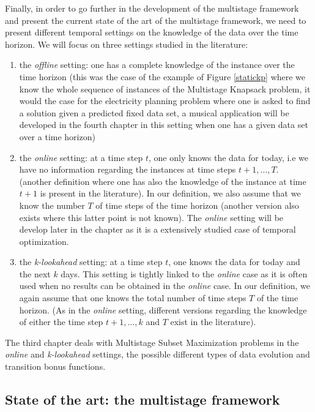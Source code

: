 \documentclass[a4paper]{book}
\begin{document}
Finally, in order to go further in the development of the multistage framework and present the current state of the art of the multistage framework, we need to present different temporal settings on the knowledge of the data over the time horizon. We will focus on three settings studied in the literature:
\begin{enumerate}
    \item the \emph{offline} setting: one has a complete knowledge of the instance over the time horizon (this was the case of the example of Figure \ref{statickp} where we know the whole sequence of instances of the {\sc Multistage Knapsack} problem, it would the case for the electricity planning problem where one is asked to find a solution given a predicted fixed data set, a musical application will be developed in the fourth chapter in this setting when one has a given data set over a time horizon)
    \item the \emph{online} setting: at a time step $t$, one only knows the data for today, i.e we have no information regarding the instances at time steps $t+1,\ldots,T$. (another definition where one has also the knowledge of the instance at time $t+1$ is present in the literature). In our definition, we also assume that we know the number $T$ of time steps of the time horizon (another version also exists where this latter point is not known). The \emph{online} setting will be develop later in the chapter as it is a extensively studied case of temporal optimization.
    \item the \emph{k-lookahead} setting: at a time step $t$, one knows the data for today and the next $k$ days. This setting is tightly linked to the \emph{online} case as it is often used when no results can be obtained in the \emph{online} case. In our definition, we again assume that one knows the total number of time steps $T$ of the time horizon. (As in the \emph{online} setting, different versions regarding the knowledge of either the time step $t+1,\ldots,k$ and $T$ exist in the literature).
\end{enumerate}

The third chapter deals with {\sc Multistage Subset Maximization} problems in the \emph{online} and \emph{k-lookahead} settings, the possible different types of data evolution and transition bonus functions. 

\subsection{State of the art: the multistage framework}\label{multisota}
\end{document}
